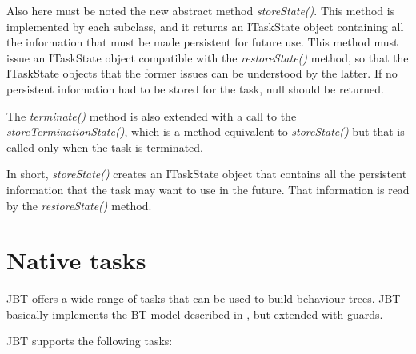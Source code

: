 \documentclass[a4paper,10pt]{article}
\begin{document}
Also here must be noted the new abstract method \textit{storeState()}. This method is implemented by each subclass, and it returns an ITaskState object containing all the information that must be made persistent for future use. This method must issue an ITaskState object compatible with the \textit{restoreState()} method, so that the ITaskState objects that the former issues can be understood by the latter. If no persistent information had to be stored for the task, null should be returned.

The \textit{terminate()} method is also extended with a call to the \textit{storeTerminationState()}, which is a method equivalent to \textit{storeState()} but that is called only when the task is terminated.

In short, \textit{storeState()} creates an ITaskState object that contains all the persistent information that the task may want to use in the future. That information is read by the \textit{restoreState()} method.

\section{Native tasks}\label{sec:NativeTasks}

JBT offers a wide range of tasks that can be used to build behaviour trees. JBT basically implements the BT model described in \cite{Millington09}, but extended with guards.

JBT supports the following tasks:
\end{document}

